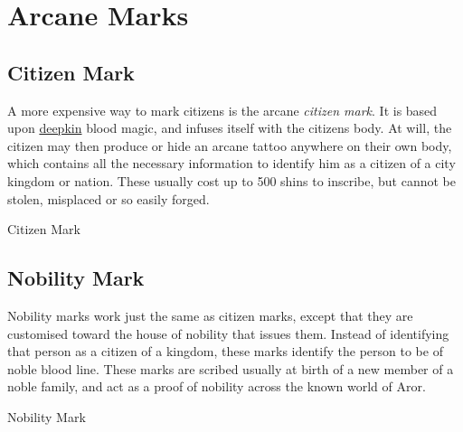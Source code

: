 \section{Arcane Marks}
\label{sec:Arcane Marks}

\subsection{Citizen Mark}
\label{sec:Citizen Mark}

A more expensive way to mark citizens is the arcane \emph{citizen mark}. It is
based upon \hyperref[sec:Deepkin]{deepkin} blood magic, and infuses itself
with the citizens body. At will, the citizen may then produce or hide an
arcane tattoo anywhere on their own body, which contains all the necessary
information to identify him as a citizen of a city kingdom or nation. These
usually cost up to 500 shins to inscribe, but cannot be stolen, misplaced or
so easily forged.

\begin{35e}{Citizen Mark}
\end{35e}

\subsection{Nobility Mark}
\label{sec:Nobility Mark}

Nobility marks work just the same as citizen marks, except that they are
customised toward the house of nobility that issues them. Instead of
identifying that person as a citizen of a kingdom, these marks identify the
person to be of noble blood line. These marks are scribed usually at birth of
a new member of a noble family, and act as a proof of nobility across the
known world of Aror.

\begin{35e}{Nobility Mark}
\end{35e}


